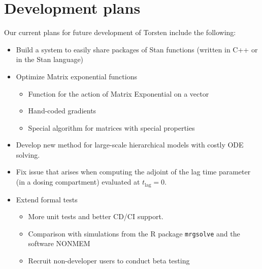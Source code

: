 \documentclass[12pt, reqno, oneside]{amsbook}
\numberwithin{equation}{chapter}
\numberwithin{figure}{chapter}
\numberwithin{table}{chapter}
\theoremstyle{remark}
\begin{document}
\section{Development plans}
\label{sec:org8ee92bb}
Our current plans for future development of Torsten include the
following:
\begin{itemize}
\item Build a system to easily share packages of Stan functions
(written in C++ or in the Stan language)
\item Optimize Matrix exponential functions
\begin{itemize}
\item Function for the action of Matrix Exponential on a vector
\item Hand-coded gradients
\item Special algorithm for matrices with special properties
\end{itemize}
\item Develop new method for large-scale hierarchical models with costly
ODE solving.
\item Fix issue that arises when computing the adjoint of the lag time
parameter (in a dosing compartment) evaluated at \(t_{\text{lag}} = 0\).
\item Extend formal tests
\begin{itemize}
\item More unit tests and better CD/CI support.
\item Comparison with simulations from the R package
\texttt{mrgsolve} and the software NONMEM\textregistered{}
\item Recruit non-developer users to conduct beta testing
\end{itemize}
\end{itemize}
\end{document}
